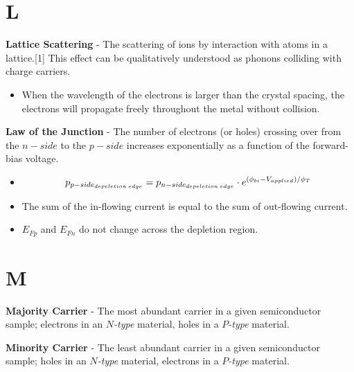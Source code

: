 \section{L}
    \textbf{Lattice Scattering} - The scattering of ions by interaction with atoms in a lattice.[1] This effect can be qualitatively understood as phonons colliding with charge carriers.
    \vspace{0.15cm}
    \begin{itemize}
        \setlength\itemsep{0.5em}
        \item{When the wavelength of the electrons is larger than the crystal spacing, the electrons will propagate freely throughout the metal without collision.}
    \end{itemize}
\vspace{0.5cm}
    \textbf{Law of the Junction} - The number of electrons (or holes) crossing over from the $n-side$ to the $p-side$ increases exponentially as a function of the forward-bias voltage.
    \vspace{0.15cm}
    \begin{itemize}
        \setlength\itemsep{0.5em}
        \item{
            \begin{equation}
                \large{p_{p-side_{depeletion\;edge}} = p_{n-side_{depeletion\;edge}} \cdot e^{(\phi_{bi} - V_{applied}) / \phi_T}}
            \end{equation}
            }
        \item{The sum of the in-flowing current is equal to the sum of out-flowing current.}
        \item{$E_{Fp}$ and $E_{Fn}$ do not change across the depletion region.}
    \end{itemize}
\section{M}
    \textbf{Majority Carrier} - The most abundant carrier in a given semiconductor sample; electrons in an $N$\emph{-type} material, holes in a $P$\emph{-type} material.

\vspace{0.5cm}
\noindent
    \textbf{Minority Carrier} - The least abundant carrier in a given semiconductor sample; holes in an $N$\emph{-type} material, electrons in a $P$\emph{-type} material.

